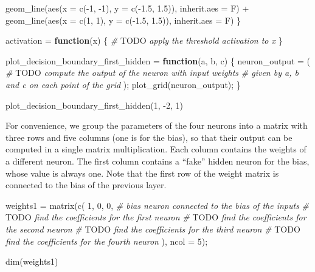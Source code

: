 \documentclass[
]{article}
\newenvironment{Shaded}{\begin{snugshade}}{\end{snugshade}}
\newcommand{\AlertTok}[1]{\textcolor[rgb]{0.94,0.16,0.16}{#1}}
\newcommand{\AttributeTok}[1]{\textcolor[rgb]{0.77,0.63,0.00}{#1}}
\newcommand{\CommentTok}[1]{\textcolor[rgb]{0.56,0.35,0.01}{\textit{#1}}}
\newcommand{\ControlFlowTok}[1]{\textcolor[rgb]{0.13,0.29,0.53}{\textbf{#1}}}
\newcommand{\DecValTok}[1]{\textcolor[rgb]{0.00,0.00,0.81}{#1}}
\newcommand{\FloatTok}[1]{\textcolor[rgb]{0.00,0.00,0.81}{#1}}
\newcommand{\FunctionTok}[1]{\textcolor[rgb]{0.00,0.00,0.00}{#1}}
\newcommand{\NormalTok}[1]{#1}
\newcommand{\OtherTok}[1]{\textcolor[rgb]{0.56,0.35,0.01}{#1}}
\newcommand{\SpecialCharTok}[1]{\textcolor[rgb]{0.00,0.00,0.00}{#1}}
\begin{document}
\begin{Shaded}
\begin{Highlighting}[]
    \FunctionTok{geom\_line}\NormalTok{(}\FunctionTok{aes}\NormalTok{(}\AttributeTok{x =} \FunctionTok{c}\NormalTok{(}\SpecialCharTok{{-}}\DecValTok{1}\NormalTok{, }\SpecialCharTok{{-}}\DecValTok{1}\NormalTok{), }\AttributeTok{y =} \FunctionTok{c}\NormalTok{(}\SpecialCharTok{{-}}\FloatTok{1.5}\NormalTok{, }\FloatTok{1.5}\NormalTok{)), }\AttributeTok{inherit.aes =}\NormalTok{ F) }\SpecialCharTok{+}
    \FunctionTok{geom\_line}\NormalTok{(}\FunctionTok{aes}\NormalTok{(}\AttributeTok{x =} \FunctionTok{c}\NormalTok{(}\DecValTok{1}\NormalTok{, }\DecValTok{1}\NormalTok{), }\AttributeTok{y =} \FunctionTok{c}\NormalTok{(}\SpecialCharTok{{-}}\FloatTok{1.5}\NormalTok{, }\FloatTok{1.5}\NormalTok{)), }\AttributeTok{inherit.aes =}\NormalTok{ F)}
\NormalTok{\}}

\NormalTok{activation }\OtherTok{=} \ControlFlowTok{function}\NormalTok{(x) \{}
  \CommentTok{\# }\AlertTok{TODO}\CommentTok{ apply the threshold activation to x}
\NormalTok{\}}

\NormalTok{plot\_decision\_boundary\_first\_hidden }\OtherTok{=} \ControlFlowTok{function}\NormalTok{(a, b, c) \{}
\NormalTok{  neuron\_output }\OtherTok{=}\NormalTok{ (}
    \CommentTok{\# }\AlertTok{TODO}\CommentTok{ compute the output of the neuron with input weights}
    \CommentTok{\# given by a, b and c on each point of the grid}
\NormalTok{  );}
  \FunctionTok{plot\_grid}\NormalTok{(neuron\_output);}
\NormalTok{\}}

\FunctionTok{plot\_decision\_boundary\_first\_hidden}\NormalTok{(}\DecValTok{1}\NormalTok{, }\SpecialCharTok{{-}}\DecValTok{2}\NormalTok{, }\DecValTok{1}\NormalTok{)}
\end{Highlighting}
\end{Shaded}

For convenience, we group the parameters of the four neurons into a
matrix with three rows and five columns (one is for the bias), so that
their output can be computed in a single matrix multiplication. Each
column contains the weights of a different neuron. The first column
contains a ``fake'' hidden neuron for the bias, whose value is always
one. Note that the first row of the weight matrix is connected to the
bias of the previous layer.

\begin{Shaded}
\begin{Highlighting}[]
\NormalTok{weights1 }\OtherTok{=} \FunctionTok{matrix}\NormalTok{(}\FunctionTok{c}\NormalTok{(}
  \DecValTok{1}\NormalTok{, }\DecValTok{0}\NormalTok{, }\DecValTok{0}\NormalTok{,   }\CommentTok{\# bias neuron connected to the bias of the inputs}
  \CommentTok{\# }\AlertTok{TODO}\CommentTok{ find the coefficients for the first neuron}
  \CommentTok{\# }\AlertTok{TODO}\CommentTok{ find the coefficients for the second neuron}
  \CommentTok{\# }\AlertTok{TODO}\CommentTok{ find the coefficients for the third neuron}
  \CommentTok{\# }\AlertTok{TODO}\CommentTok{ find the coefficients for the fourth neuron}
\NormalTok{), }\AttributeTok{ncol =} \DecValTok{5}\NormalTok{);}

\FunctionTok{dim}\NormalTok{(weights1)}
\end{Highlighting}
\end{Shaded}
\end{document}
